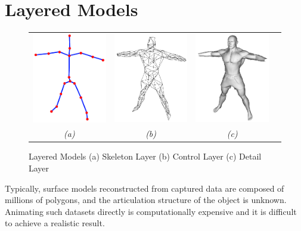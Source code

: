 \section{\label{sec:introduction:layered}Layered Models}

\begin{figure}
\begin{center}
\begin{tabular}{cccc}
\includegraphics[width=4.4cm]{../images/skeleton_layer} &
\includegraphics[width=4.4cm]{../images/control_layer} &
\includegraphics[width=4.4cm]{../images/detail_layer} \\
{\it(a)} & {\it(b)} & {\it(c)}
\end{tabular}
\caption[Layered Models]{\label{fig:layeredmodel} Layered Models (a) Skeleton Layer  (b) Control Layer  (c) Detail Layer}
\end{center}
\end{figure}

Typically, surface models reconstructed from captured data are composed of millions of polygons, and the articulation structure of the object is unknown. Animating such datasets directly is computationally expensive and it is difficult to achieve a realistic result. 

